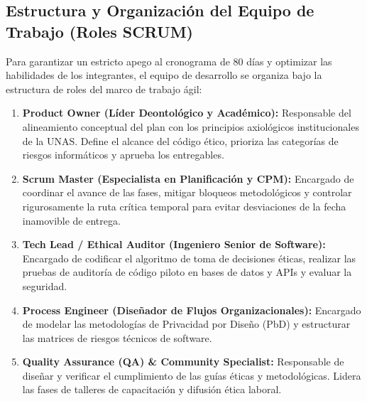 \documentclass[12pt,a4paper]{article}
\begin{document}
\subsection{Estructura y Organización del Equipo de Trabajo (Roles SCRUM)}
Para garantizar un estricto apego al cronograma de 80 días y optimizar las habilidades de los integrantes, el equipo de desarrollo se organiza bajo la estructura de roles del marco de trabajo ágil:
\begin{enumerate}
    \item \textbf{Product Owner (Líder Deontológico y Académico):} Responsable del alineamiento conceptual del plan con los principios axiológicos institucionales de la UNAS. Define el alcance del código ético, prioriza las categorías de riesgos informáticos y aprueba los entregables.
    \item \textbf{Scrum Master (Especialista en Planificación y CPM):} Encargado de coordinar el avance de las fases, mitigar bloqueos metodológicos y controlar rigurosamente la ruta crítica temporal para evitar desviaciones de la fecha inamovible de entrega.
    \item \textbf{Tech Lead / Ethical Auditor (Ingeniero Senior de Software):} Encargado de codificar el algoritmo de toma de decisiones éticas, realizar las pruebas de auditoría de código piloto en bases de datos y APIs y evaluar la seguridad.
    \item \textbf{Process Engineer (Diseñador de Flujos Organizacionales):} Encargado de modelar las metodologías de Privacidad por Diseño (PbD) y estructurar las matrices de riesgos técnicos de software.
    \item \textbf{Quality Assurance (QA) \& Community Specialist:} Responsable de diseñar y verificar el cumplimiento de las guías éticas y metodológicas. Lidera las fases de talleres de capacitación y difusión ética laboral.
\end{enumerate}
\end{document}
